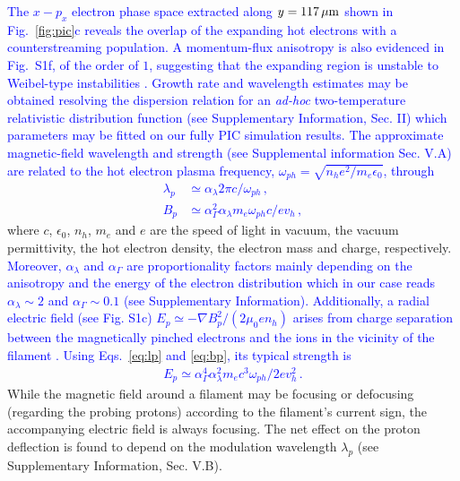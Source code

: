 \documentclass[aps,twocolumn,showpacs,superscriptaddress]{revtex4}
\begin{document}
\textcolor{blue}{The $x-p_x$ electron phase space extracted along $y = 117\,\rm \mu m$ shown in Fig.~\ref{fig:pic}c reveals the overlap of the expanding hot electrons  with a counterstreaming population. A momentum-flux anisotropy is also evidenced in Fig.~S1f, of the order of $1$, suggesting that the expanding region is unstable to Weibel-type instabilities \cite{POP_Ren_2006, PRL_Gode_2017}. Growth rate and wavelength estimates may be obtained resolving the dispersion relation  for an \emph{ad-hoc} two-temperature relativistic distribution function (see Supplementary Information, Sec. II) which parameters may be fitted on our fully PIC simulation results.
The approximate magnetic-field wavelength and strength (see Supplemental information Sec. V.A) are related to the hot electron plasma frequency, $\omega_{ph}=\sqrt{n_h e^2/m_e \epsilon_0}$, through 
\begin{align}
  \lambda_p &\simeq \alpha_\lambda 2\pi c/\omega_{ph} \label{eq:lp}  \,,\\
  B_p &\simeq \alpha_\Gamma^2\alpha_\lambda m_e \omega_{ph}c/ ev_h \label{eq:bp} \,, 
\end{align}}
where $c$, $\epsilon_0$, $n_h$, $m_e$ and $e$ are the speed of light in vacuum, the vacuum permittivity, the hot electron density, the electron mass and  charge, respectively. \textcolor{blue}{Moreover, $\alpha_\lambda $ and $\alpha_\Gamma $ are proportionality factors mainly depending on the anisotropy and the energy of the  electron distribution  which  in our case reads $\alpha_\lambda\sim 2 $ and $\alpha_\Gamma\sim 0.1 $ (see Supplementary Information).
Additionally, a radial electric field (see Fig. S1c) $E_p \simeq - \nabla B_p^2/(2 \mu_0e n_h)$ arises from charge separation between the magnetically pinched electrons and the ions in the vicinity of the filament \cite{POP_Dieckmann_2009, POP_Bret_Gremillet_2010}. 
Using Eqs.~\eqref{eq:lp} and \eqref{eq:bp}, its typical strength is 
\begin{align} 
  E_p \simeq \alpha_\Gamma^4  \alpha_\lambda^2 m_ec^3\omega_{ph}/2ev_h^2 \label{eq:ep} \, .
\end{align}}
While the magnetic field around a filament may be focusing or defocusing (regarding the probing protons) according to the filament's current sign, the accompanying electric field is always focusing. The net effect on the proton deflection is found to depend on the modulation wavelength $\lambda_p$ (see Supplementary Information, Sec. V.B).
\end{document}
